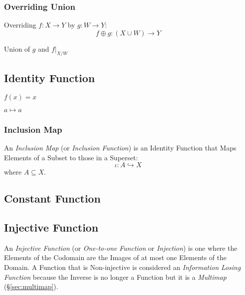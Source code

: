 \subsubsection{Overriding Union}\label{sec:overriding_union}

Overriding $f : X \rightarrow Y$ by $g : W \rightarrow Y$:
\[
  f \oplus g : (X \cup W) \rightarrow Y
\]

Union of $g$ and $f|_{X/W}$



\subsection{Identity Function}\label{sec:identity_function}

$f(x) = x$

$a \mapsto a$



\subsubsection{Inclusion Map}\label{sec:inclusion_map}

An \emph{Inclusion Map} (or \emph{Inclusion Function}) is an Identity
Function that Maps Elements of a Subset to those in a Superset:
\[
  \iota : A \hookrightarrow X
\]
where $A \subseteq X$.



\subsection{Constant Function}\label{sec:constant_function}

\subsection{Injective Function}\label{sec:injective_function}

An \emph{Injective Function} (or \emph{One-to-one Function} or
\emph{Injection}) is one where the Elements of the Codomain are the
Images of at most one Elements of the Domain. A Function that is
Non-injective is considered an \emph{Information Losing Function}
because the Inverse is no longer a Function but it is a
\emph{Multimap} (\S\ref{sec:multimap}).



